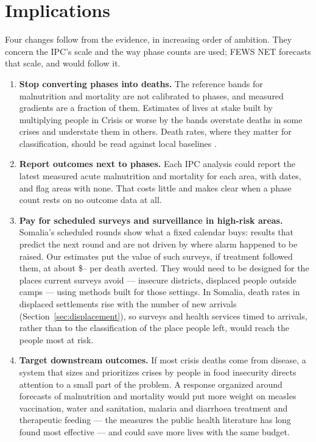 \documentclass[11pt]{article}
\begin{document}
\section{Implications}\label{sec:implications}

Four changes follow from the evidence, in increasing order of ambition. They concern the IPC's scale and the way phase counts are used; FEWS NET forecasts that scale, and would follow it.
\begin{enumerate}
  \item \textbf{Stop converting phases into deaths.} The reference bands for malnutrition and mortality are not calibrated to phases, and measured gradients are a fraction of them. Estimates of lives at stake built by multiplying people in Crisis or worse by the bands overstate deaths in some crises and understate them in others. Death rates, where they matter for classification, should be read against local baselines \citep{deZwarte2026Lancet}.
  \item \textbf{Report outcomes next to phases.} Each IPC analysis could report the latest measured acute malnutrition and mortality for each area, with dates, and flag areas with none. That costs little and makes clear when a phase count rests on no outcome data at all.
  \item \textbf{Pay for scheduled surveys and surveillance in high-risk areas.} Somalia's scheduled rounds show what a fixed calendar buys: results that predict the next round and are not driven by where alarm happened to be raised. Our estimates put the value of such surveys, if treatment followed them, at about \$\voiRangeLo{}--\voiRangeHi{} per death averted. They would need to be designed for the places current surveys avoid --- insecure districts, displaced people outside camps --- using methods built for those settings. In Somalia, death rates in displaced settlements rise with the number of new arrivals (Section~\ref{sec:displacement}), so surveys and health services timed to arrivals, rather than to the classification of the place people left, would reach the people most at risk.
  \item \textbf{Target downstream outcomes.} If most crisis deaths come from disease, a system that sizes and prioritizes crises by people in food insecurity directs attention to a small part of the problem. A response organized around forecasts of malnutrition and mortality would put more weight on measles vaccination, water and sanitation, malaria and diarrhoea treatment and therapeutic feeding --- the measures the public health literature has long found most effective --- and could save more lives with the same budget.
\end{enumerate}
\end{document}
